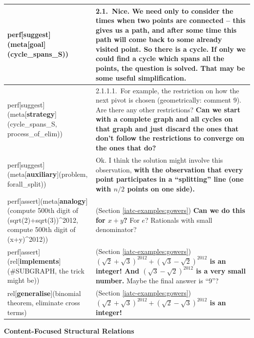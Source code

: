 \documentclass[smallextended,oneside]{svjour3}       %
\begin{document}
\noindent
\noindent\begin{tabular}{|p{}|p{}|}
\hline
perf[suggest](meta[\textbf{goal}](cycle_spans_S)) & 2.1.~Nice. We need only to consider the times when two points are connected -- this gives us a path, and after some time this path will come back to some already visited point. So there is a cycle. \textbf{If only we could find a cycle which spans all the points, the question is solved}. That may be some useful simplification.\\ \hline
perf[suggest](meta[\textbf{strategy}](cycle_spans_S, process_of_elim)) & 2.1.1.1.~For example, the restriction on how the next pivot is chosen (geometrically: comment 9). Are there any other restrictions? \textbf{Can we start with a complete graph and all cycles on that graph and just discard the ones that don't follow the restrictions to converge on the ones that do?}\\ \hline
perf[suggest](meta[\textbf{auxiliary}](problem, forall_split)) & Ok. I think the solution might involve this observation, \textbf{with the observation that every point participates in a ``splitting'' line (one with $n/2$ points on one side).}\\ \hline
perf[assert](meta[\textbf{analogy}](compute 500th digit of (sqrt(2)+sqrt(3))\textasciicircum2012, compute 500th digit of (x+y)\textasciicircum2012)) & (Section \ref{iatc-examples:gowers}) \textbf{Can we do this for $x+y$?} For $e$?  Rationals with small denominator?\\ \hline
perf[assert](rel[\textbf{implements}](\#SUBGRAPH, the trick might be))  & (Section \ref{iatc-examples:gowers}) \textbf{$(\sqrt{2}+\sqrt{3})^{2012}+(\sqrt{3}-\sqrt{2})^{2012}$ is an integer! And $(\sqrt{3}-\sqrt{2})^{2012}$ is a very small number.} Maybe the final answer is ``9''?\\ \hline
rel[\textbf{generalise}](binomial theorem, eliminate cross terms) & (Section \ref{iatc-examples:gowers}) \textbf{$(\sqrt{2}+\sqrt{3})^{2012} + (\sqrt{2}-\sqrt{3})^{2012}$ is an integer!} \\
\hline
\end{tabular}

\newpage

{\centering
\textbf{Content-Focused Structural Relations}

\par}

\smallskip
\end{document}

